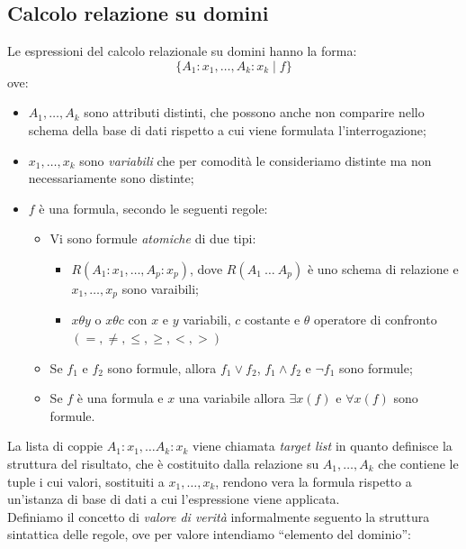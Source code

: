 \documentclass[12pt]{report}
\begin{document}
 	\subsection{Calcolo relazione su domini}
 	Le espressioni del calcolo relazionale su domini hanno la forma:
 	\[
 	\{A_1: x_1, \dots, A_k: x_k \mid f\}
 	\]
 	ove:
 	\begin{itemize}
 		\item $A_1, \dots, A_k$ sono attributi distinti, che possono anche non comparire nello schema della base di dati rispetto a cui viene formulata l'interrogazione;
 		\item $x_1, \dots, x_k$ sono \textit{variabili} che per comodità le consideriamo distinte ma non necessariamente sono distinte;
 		\item $f$ è una formula, secondo le seguenti regole:
 		\begin{itemize}
 			\item Vi sono formule \textit{atomiche} di due tipi:
 			\begin{itemize}
 				\item $R(A_1: x_1, \dots, A_p: x_p)$, dove $R(A_1\ \dots\ A_p)$ è uno schema di relazione e $x_1, \dots, x_p$ sono varaibili;
 				\item $x\theta y$ o $x\theta c$ con $x$ e $y$ variabili, $c$ costante e $\theta$ operatore di confronto $(= , \neq, \leq, \geq, <, >)$
 			\end{itemize}
 			\item Se $f_1$ e $f_2$ sono formule, allora $f_1 \vee f_2$, $f_1 \wedge f_2$ e $\neg f_1$ sono formule;
 			\item Se $f$ è una formula e $x$ una variabile allora $\exists x(f)$ e $\forall x(f)$ sono formule.
 		\end{itemize}
 	\end{itemize}
 	La lista di coppie $A_1: x_1, \dots A_k: x_k$ viene chiamata \textit{target list} in quanto definisce la struttura del risultato, che è costituito dalla relazione su $A_1, \dots, A_k$ che contiene le tuple i cui valori, sostituiti a $x_1, \dots, x_k$, rendono vera la formula rispetto a un'istanza di base di dati a cui l'espressione viene applicata. \\
 	Definiamo il concetto di \textit{valore di verità} informalmente seguento la struttura sintattica delle regole, ove per valore intendiamo ``elemento del dominio'':
\end{document}

